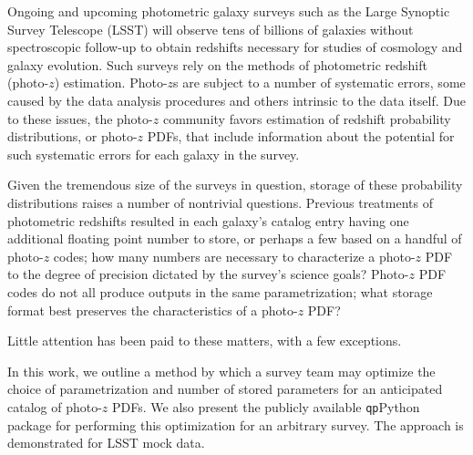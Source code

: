 \documentclass[\docopts]{\docclass}
\newcommand{\qp}{\texttt{qp}}
\begin{document}
Ongoing and upcoming photometric galaxy surveys such as the Large Synoptic Survey Telescope (LSST) will observe tens of billions of galaxies without spectroscopic follow-up to obtain redshifts necessary for studies of cosmology and galaxy evolution.  Such surveys rely on the methods of photometric redshift (photo-$z$) estimation.  Photo-$z$s are subject to a number of systematic errors, some caused by the data analysis procedures and others intrinsic to the data itself.  Due to these issues, the photo-$z$ community favors estimation of redshift probability distributions, or photo-$z$ PDFs, that include information about the potential for such systematic errors for each galaxy in the survey.

Given the tremendous size of the surveys in question, storage of these probability distributions raises a number of nontrivial questions.  Previous treatments of photometric redshifts resulted in each galaxy's catalog entry having one additional floating point number to store, or perhaps a few based on a handful of photo-$z$ codes; how many numbers are necessary to characterize a photo-$z$ PDF to the degree of precision dictated by the survey's science goals?  Photo-$z$ PDF codes do not all produce outputs in the same parametrization; what storage format best preserves the characteristics of a photo-$z$ PDF?

Little attention has been paid to these matters, with a few exceptions.  \citep{carrasco_kind_sparse_2014}

In this work, we outline a method by which a survey team may optimize the choice of parametrization and number of stored parameters for an anticipated catalog of photo-$z$ PDFs.  We also present the publicly available \qp Python package for performing this optimization for an arbitrary survey.  The approach is demonstrated for LSST mock data.





%
\end{document}
